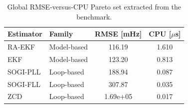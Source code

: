 \begin{table}[t]
\centering
\caption{Global RMSE-versus-CPU Pareto set extracted from the benchmark.}
\label{tab:pareto_set}
\scriptsize
\setlength{\tabcolsep}{3.5pt}
\renewcommand{\arraystretch}{1.08}
\begin{tabular}{l l c c}
\toprule
Estimator & Family & RMSE [mHz] & CPU [$\mu$s] \\
\midrule
RA-EKF & Model-based & 116.19 & 1.610 \\
EKF & Model-based & 123.20 & 0.813 \\
SOGI-PLL & Loop-based & 188.94 & 0.087 \\
SOGI-FLL & Loop-based & 307.87 & 0.035 \\
ZCD & Loop-based & 1.69e+05 & 0.017 \\
\bottomrule
\end{tabular}
\end{table}
